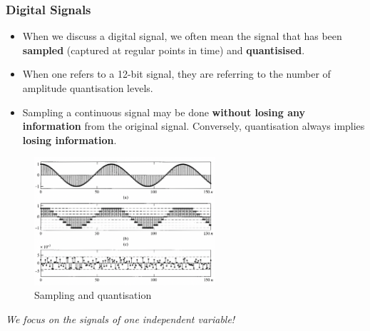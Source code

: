 \subsubsection{Digital Signals}
\begin{itemize}
    \item When we discuss a digital signal, we often mean the signal that has been \textbf{sampled} (captured at regular points in time) and \textbf{quantisised}.

    \item When one refers to a 12-bit signal, they are referring to the number of amplitude quantisation levels.

    \item Sampling a continuous signal may be done \textbf{without losing any information} from the original signal. Conversely, quantisation always implies \textbf{losing information}.
\end{itemize}
\begin{figure}[h!]
    \centering
    \includegraphics[width = 0.6\textwidth]{images/1.2.1}
    \caption{Sampling and quantisation}
\end{figure}
\textit{We focus on the signals of one independent variable!}
 

